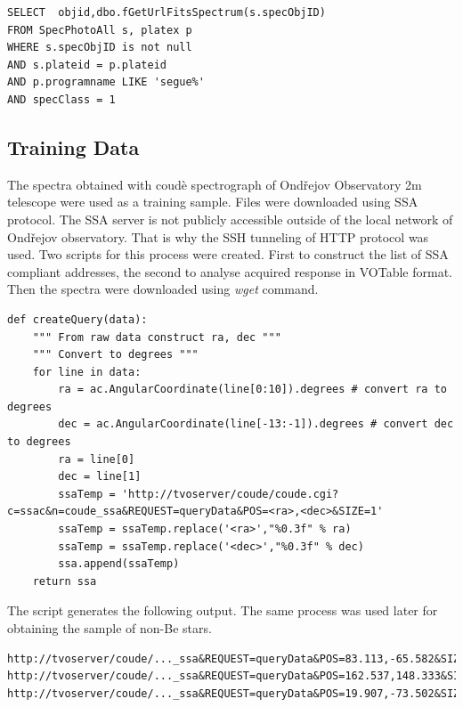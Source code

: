 \begin{lstlisting}
SELECT  objid,dbo.fGetUrlFitsSpectrum(s.specObjID)                                                           
FROM SpecPhotoAll s, platex p                                                                         
WHERE s.specObjID is not null                                                                         
AND s.plateid = p.plateid                                                                             
AND p.programname LIKE 'segue%'                                                                       
AND specClass = 1
\end{lstlisting}

\subsection{Training Data}
The spectra obtained with coud\`e spectrograph of Ond\v{r}ejov
Observatory 2m telescope were used as a training sample. Files were
downloaded using SSA protocol. The SSA server is not publicly
accessible outside of the local network of Ond\v{r}ejov observatory.
That is why the SSH tunneling of HTTP protocol was used. Two scripts
for this process were created. First to construct the list of SSA
compliant addresses, the second to analyse acquired response in
VOTable format. Then the spectra were downloaded using \emph{wget}
command.


\begin{lstlisting}
def createQuery(data):
    """ From raw data construct ra, dec """
    """ Convert to degrees """
    for line in data:
        ra = ac.AngularCoordinate(line[0:10]).degrees # convert ra to degrees
        dec = ac.AngularCoordinate(line[-13:-1]).degrees # convert dec to degrees
        ra = line[0]
        dec = line[1]
        ssaTemp = 'http://tvoserver/coude/coude.cgi?c=ssac&n=coude_ssa&REQUEST=queryData&POS=<ra>,<dec>&SIZE=1'
        ssaTemp = ssaTemp.replace('<ra>',"%0.3f" % ra)
        ssaTemp = ssaTemp.replace('<dec>',"%0.3f" % dec)
        ssa.append(ssaTemp)
    return ssa
\end{lstlisting}

The script generates the following output. The same process was used
later for obtaining the sample of non-Be stars.

\begin{lstlisting}
http://tvoserver/coude/..._ssa&REQUEST=queryData&POS=83.113,-65.582&SIZE=60
http://tvoserver/coude/..._ssa&REQUEST=queryData&POS=162.537,148.333&SIZE=60
http://tvoserver/coude/..._ssa&REQUEST=queryData&POS=19.907,-73.502&SIZE=60
\end{lstlisting}


